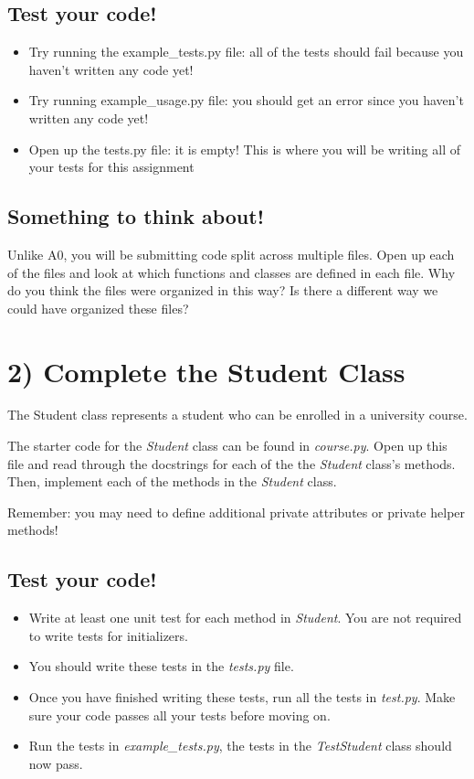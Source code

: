 \documentclass[12pt]{article}
\begin{document}
\bigskip

\subsection*{Test your code!}

\begin{itemize}
    \item Try running the example\_tests.py file: all of the tests should fail because you haven’t written any code yet!
    \item Try running example\_usage.py file: you should get an error since you haven’t written any code yet!
    \item Open up the tests.py file: it is empty! This is where you will be writing all of your tests for this assignment
\end{itemize}

\subsection*{Something to think about!}
Unlike A0, you will be submitting code split across multiple files. Open up each
of the files and look at which functions and classes are defined in each file. Why do you think the files were organized
in this way? Is there a different way we could have organized these files?

\section*{2) Complete the Student Class}
The Student class represents a student who can be enrolled in a university
course.

\bigskip

\noindent The starter code for the \textit{Student} class can be found in \textit{course.py}. Open up this
file and read through the docstrings for each of the the \textit{Student} class’s methods.
Then, implement each of the methods in the \textit{Student} class.

\bigskip

\noindent Remember: you may need to define additional private attributes or
private helper methods!

\bigskip

\subsection*{Test your code!}
\begin{itemize}
    \item Write at least one unit test for each method in \textit{Student}. You are not
    required to write tests for initializers.
    \item You should write these tests in the \textit{tests.py} file.
    \item Once you have finished writing these tests, run all the tests in \textit{test.py}.
    Make sure your code passes all your tests before moving on.
    \item Run the tests in \textit{example\_tests.py}, the tests in the \textit{TestStudent} class should now pass.
\end{itemize}
\end{document}
